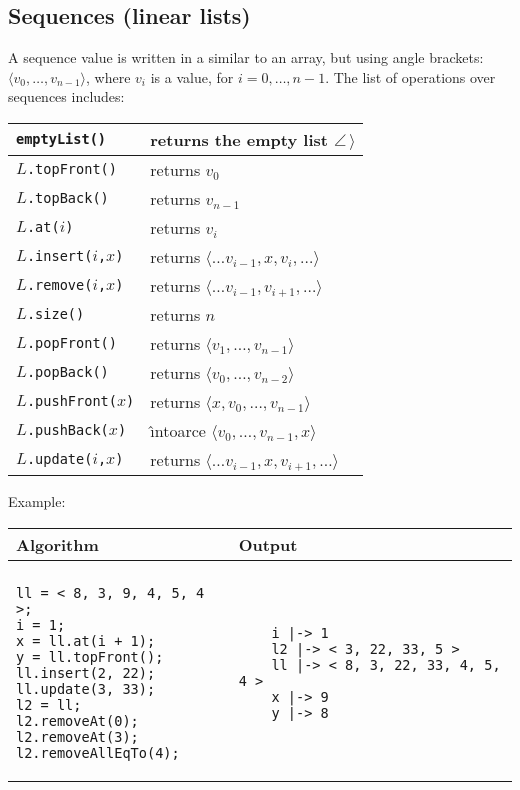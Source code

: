 \documentclass[a4paper]{report}
\begin{document}
\subsection{Sequences (linear lists)}

A sequence value is written in a similar to an array, but using angle brackets: $\langle v_0,\ldots,v_{n-1}\rangle$, where $v_i$ is a value, for $i=0,\ldots,n-1$. 
The list of operations over sequences includes:
\begin{center}
\begin{tabular}{|l|l|}
\hline
\texttt{emptyList()}
&
returns the empty list $\angle\,\rangle$\\
\hline
$L$\texttt{.topFront()}
&
returns $v_0$\\
\hline
$L$\texttt{.topBack()}
&
returns $v_{n-1}$\\
\hline
$L$\texttt{.at($i$)}
&
returns $v_i$\\
\hline
$L$\texttt{.insert($i$,$x$)}
&
returns $\langle\ldots v_{i-1},x,v_i,\ldots\rangle$\\
\hline
$L$\texttt{.remove($i$,$x$)}
&
returns $\langle\ldots v_{i-1},v_{i+1},\ldots\rangle$\\
\hline
$L$\texttt{.size()}
&
returns $n$\\
\hline
 $L$\texttt{.popFront()}
&
returns $\langle v_1,\ldots,v_{n-1}\rangle$\\
\hline
$L$\texttt{.popBack()}
&
returns $\langle v_0,\ldots,v_{n-2}\rangle$\\
\hline
$L$\texttt{.pushFront($x$)}
&
returns $\langle x,v_0,\ldots,v_{n-1}\rangle$\\
\hline
$L$\texttt{.pushBack($x$)}
&
\^{\i}ntoarce $\langle v_0,\ldots,v_{n-1},x\rangle$\\
\hline
$L$\texttt{.update($i$,$x$)}
&
returns $\langle\ldots v_{i-1},x,v_{i+1},\ldots\rangle$\\
\hline
\end{tabular}
\end{center}
Example:
\begin{center}
\begin{tabular}{ll}
Algorithm & Output\\
\hline
\\
\begin{minipage}{.35\textwidth}
\begin{verbatim}
ll = < 8, 3, 9, 4, 5, 4 >;
i = 1;
x = ll.at(i + 1);
y = ll.topFront();
ll.insert(2, 22);
ll.update(3, 33);
l2 = ll;
l2.removeAt(0);
l2.removeAt(3);
l2.removeAllEqTo(4);
\end{verbatim}
\end{minipage}
&
\begin{minipage}{.55\textwidth}
\begin{verbatim}
    i |-> 1
    l2 |-> < 3, 22, 33, 5 >
    ll |-> < 8, 3, 22, 33, 4, 5, 4 >
    x |-> 9
    y |-> 8
\end{verbatim}
\end{minipage}
\end{tabular}
\end{center}
\end{document}
